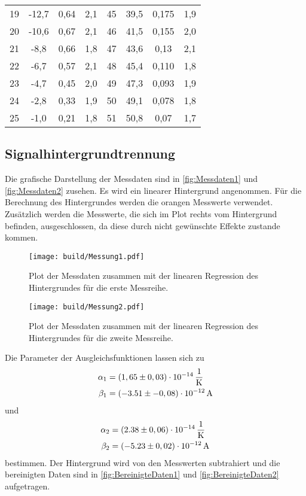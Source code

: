\begin{table}[H]
\begin{tabular}{c c c c c c c c}
        19  &-12,7   &0,64    & 2,1&45  &39,5   & 0,175 & 1,9 \\
        20  &-10,6   &0,67    & 2,1&46  &41,5   & 0,155 & 2,0 \\
        21  &-8,8    &0,66    & 1,8&47  &43,6   & 0,13  & 2,1\\
        22  &-6,7    &0,57    & 2,1&48  &45,4   & 0,110 & 1,8 \\
        23  &-4,7    &0,45    & 2,0&49  &47,3   & 0,093 & 1,9 \\
        24  &-2,8    &0,33    & 1,9&50  &49,1   & 0,078 & 1,8 \\
        25  &-1,0    &0,21    & 1,8&51  &50,8   & 0,07  & 1,7\\
        \bottomrule
        \end{tabular}
        \end{table}
  
  

\subsection{Signalhintergrundtrennung}
\label{sec:Signalhintergrundtrennung}
        
Die grafische Darstellung der Messdaten sind in \autoref{fig:Messdaten1} und \autoref{fig:Messdaten2} zusehen.
Es wird ein linearer Hintergrund angenommen. Für die Berechnung des Hintergrundes werden die orangen Messwerte verwendet.
Zusätzlich werden die Messwerte, die sich im Plot rechts vom Hintergrund befinden, ausgeschlossen, da diese durch nicht gewünschte Effekte zustande kommen. 
\begin{figure}[H]
    \centering
    \texttt{[image: build/Messung1.pdf]}
    \caption{Plot der Messdaten zusammen mit der linearen Regression des Hintergrundes für die erste Messreihe.}
    \label{fig:Messdaten1}
\end{figure}
\begin{figure}[H]
    \centering
    \texttt{[image: build/Messung2.pdf]}
    \caption{Plot der Messdaten zusammen mit der linearen Regression des Hintergrundes für die zweite Messreihe.}
    \label{fig:Messdaten2}
\end{figure}
Die Parameter der Ausgleichsfunktionen lassen sich zu 
\begin{align*}
    \alpha_1 &=         (1,65 \pm 0,03 ) \cdot 10^{-14} \,\unit{\dfrac{1}{\kelvin}} \\
    \beta_1  &=         (-3.51 \pm-0,08) \cdot 10^{-12} \,\unit{\ampere} 
\end{align*}
und 
\begin{align*}
    \alpha_2 &=         ( 2.38 \pm 0,06 ) \cdot 10^{-14}  \,\unit{\dfrac{1}{\kelvin}} \\
    \beta_2  &=         (-5.23 \pm 0,02 ) \cdot 10^{-12} \,\unit{\ampere} 
\end{align*}
bestimmen.
Der Hintergrund wird von den Messwerten subtrahiert und die bereinigten Daten sind in 
\autoref{fig:BereinigteDaten1} und \autoref{fig:BereinigteDaten2} aufgetragen.

